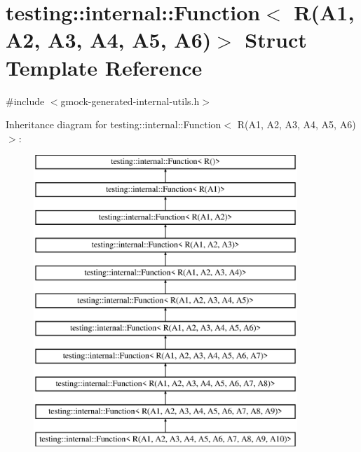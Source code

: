 \hypertarget{structtesting_1_1internal_1_1_function_3_01_r_07_a1_00_01_a2_00_01_a3_00_01_a4_00_01_a5_00_01_a6_08_4}{}\section{testing\+::internal\+::Function$<$ R(A1, A2, A3, A4, A5, A6)$>$ Struct Template Reference}
\label{structtesting_1_1internal_1_1_function_3_01_r_07_a1_00_01_a2_00_01_a3_00_01_a4_00_01_a5_00_01_a6_08_4}


{\ttfamily \#include $<$gmock-\/generated-\/internal-\/utils.\+h$>$}

Inheritance diagram for testing\+::internal\+::Function$<$ R(A1, A2, A3, A4, A5, A6)$>$\+:\begin{figure}[H]
\begin{center}
\leavevmode
\includegraphics[height=11.000000cm]{d9/d0b/structtesting_1_1internal_1_1_function_3_01_r_07_a1_00_01_a2_00_01_a3_00_01_a4_00_01_a5_00_01_a6_08_4}
\end{center}
\end{figure}
